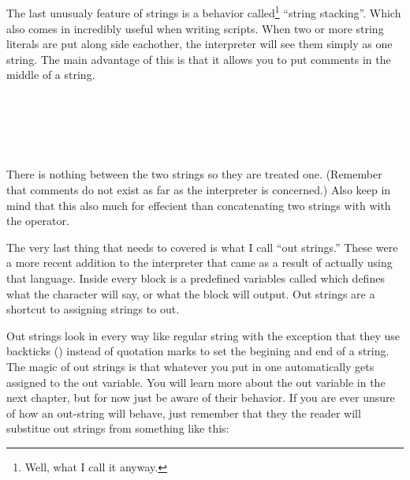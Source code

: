 \documentclass{book}
\begin{document}
\begin{SSCodeBox}
\scitea{ } \\
 \\
 \\
 \\
\scitea{;}
\end{SSCodeBox}

The last unusualy feature of strings is a behavior called\footnote{Well, what I call it anyway.} ``string stacking''.  Which also comes in incredibly useful when writing scripts.  When two or more string literals are put along side eachother, the interpreter will see them simply as one string.  The main advantage of this is that it allows you to put comments in the middle of a string.

\begin{SSCodeBox}
\scitea{} \\
\scitea{ =} \\
\scitea{} \\
\scitea{} \\
\scitea{;}
\end{SSCodeBox}

There is nothing between the two strings so they are treated one. (Remember that comments do not exist as far as the interpreter is concerned.)  Also keep in mind that this also much for effecient than concatenating two strings with with the \SSCode{+} operator.

The very last thing that needs to covered is what I call ``out strings.''  These were a more recent addition to the interpreter that came as a result of actually using that language.  Inside every block is a predefined variables called  which defines what the character will say, or what the block will output.  Out strings are a shortcut to assigning strings to out.

Out strings look in every way like regular string with the exception that they use backticks (\SSCode{\`{}}) instead of quotation marks to set the begining and end of a string.  The magic of out strings is that whatever you put in one automatically gets assigned to the out variable.  You will learn more about the out variable in the next chapter, but for now just be aware of their behavior.  If you are ever unsure of how an out-string will behave, just remember that they the reader will substitue out strings from something like this:
\end{document}
